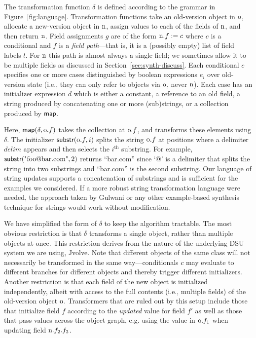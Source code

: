 \documentclass[natbib]{sigplanconf}
\begin{document}
The transformation function $\delta$ is defined according to the grammar in
Figure~\ref{fig:language}.  Transformation functions take an old-version
object in $\textrm{o}$, allocate a new-version object in $\textrm{n}$,
assign values to each of the fields of $\textrm{n}$, and then return
$\textrm{n}$.  Field assignments $g$ are of the form $\textrm{n}.f := c$
where $c$ is a conditional and $f$ is a \emph{field path}---that is,
it is a (possibly empty) list of field labels $l$.  For $\textrm{n}$ this
path is almost always a single field; we sometimes allow it to be
multiple fields as discussed in Section~\ref{sec:synth-discuss}.  Each conditional $c$
specifies one or more cases distinguished by boolean expressions $e_i$
over old-version state (i.e., they can only refer to objects via
$\textrm{o}$, never $\textrm{n}$).  Each case has an initializer expression
$d$ which is either a constant, a reference to an old field, a string
produced by concatenating one or more (sub)strings, or a collection
produced by $\textsf{map}$.

Here, $\textsf{map}(\delta,\textrm{o}.f)$ takes the collection at
$\textrm{o}.f$, and 
transforms these elements using $\delta$.  The initializer
$\textsf{substr}(\textrm{o}.f,i)$ splits the string $\textrm{o}.f$ at positions
where a delimiter $\mathit{delim}$ appears and then selects the
$i^\text{th}$ substring.
For example, $\textsf{substr}(\text{"foo@bar.com"},2)$ returns
``bar.com'' since `@' is a delimiter that splits the string into two substrings
and ``bar.com'' is the second substring.  Our language of
string updates supports a concatenation of substrings and is
sufficient for the examples we considered.  If a more robust string
transformation language were needed, the approach taken by Gulwani
\cite{Gulwani:popl:2011,Gulwani:pldi:2011} or any other example-based
synthesis technique for strings would work without
modification.


We have simplified the form of $\delta$ to keep the algorithm
tractable.  The most obvious restriction is that $\delta$ transforms a
single object, rather than multiple objects at once.  This restriction
derives from the nature of the underlying DSU system we are using,
Jvolve.  Note that different objects of the same class will not
necessarily be transformed in the same way---conditionals $c$ may
evaluate to different branches for different objects and thereby
trigger different initializers.  Another restriction is that each
field of the new object is initialized independently, albeit with
access to the full contents (i.e., multiple fields) of the old-version
object $\textrm{o}$.  Transformers that are ruled out by this setup
include those that initialize field $f$ according to the
\emph{updated} value for 
field $f'$ as well as those that pass values across the object graph,
e.g. using the value in $\textrm{o}.f_1$ when updating field
$\textrm{n}.f_2.f_3$.
\end{document}

